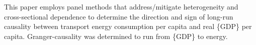 This paper employs panel methods that address/mitigate heterogeneity and cross-sectional dependence to determine the direction and sign of long-run causality between transport energy consumption per capita and real \{GDP\} per capita. Granger-causality was determined to run from \{GDP\} to energy.